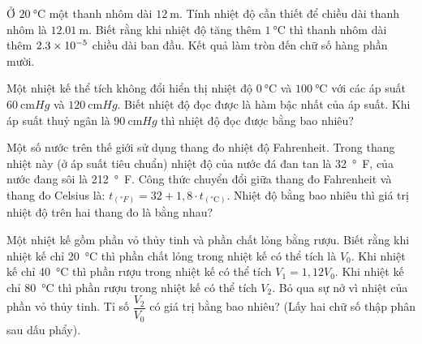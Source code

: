 \begin{ex}
Ở $\SI{20}{\celsius}$ một thanh nhôm dài $\SI{12}{\meter}$. Tính nhiệt độ cần thiết để chiều dài thanh nhôm là $\SI{12.01}{\meter}$. Biết rằng khi nhiệt độ tăng thêm $\SI{1}{\celsius}$ thì thanh nhôm dài thêm $\SI{2.3E-5}{}$ chiều dài ban đầu. 	Kết quả làm tròn đến chữ số hàng phần mười.
\end{ex}


\begin{ex}
Một nhiệt kế thể tích không đổi hiển thị nhiệt độ $\SI{0}{\celsius}$ và $\SI{100}{\celsius}$ với các áp suất $\SI{60}{\centi\meter Hg}$ và $\SI{120}{\centi\meter Hg}$. Biết nhiệt độ đọc được là hàm bậc nhất của áp suất. Khi áp suất thuỷ ngân là $\SI{90}{\centi\meter Hg}$ thì nhiệt độ đọc được bằng bao nhiêu?

\end{ex}
\begin{ex}
	Một số nước trên thế giới sử dụng thang đo nhiệt độ Fahrenheit. Trong thang nhiệt này (ở áp suất tiêu chuẩn) nhiệt độ của nước đá đan tan là \SI{32}{\degree F}, của nước đang sôi là \SI{212}{\degree F}. Công thức chuyển đổi giữa thang đo Fahrenheit và thang đo Celsius là: $t_{\left(\si{\degree F}\right)}=32+1,8 \cdot t_{\left(\si{\celsius}\right)}$. Nhiệt độ bằng bao nhiêu thì giá trị nhiệt độ trên hai thang đo là bằng nhau?
\end{ex}
\begin{ex}
	Một nhiệt kế gồm phần vỏ thủy tinh và phần chất lỏng bằng rượu. Biết rằng khi nhiệt kế chỉ \SI{20}{\celsius} thì phần chất lỏng trong nhiệt kế có thể tích là $V_0$. Khi nhiệt kế chỉ \SI{40}{\celsius} thì phần rượu trong nhiệt kế có thể tích $V_1=1,12 V_0$. Khi nhiệt kế chỉ \SI{80}{\celsius} thì phần rượu trong nhiệt kế có thể tích $V_2$. Bỏ qua sự nở vì nhiệt của phần vỏ thủy tinh. Tỉ số $\dfrac{V_2}{V_0}$ có giá trị bằng bao nhiêu? (Lấy hai chữ số thập phân sau dấu phẩy).
\end{ex}



